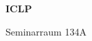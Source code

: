 \documentclass[a4paper]{article}
\begin{document}
\printGenericVSLHeader
\begin{center}
\begin{vsltext}{3cm}{4cm}

   \vspace{0.5cm} 

    \textbf{ICLP} 

    \vspace{1.5cm}

    Seminarraum 134A

\end{vsltext}

\end{center}
\end{document}
